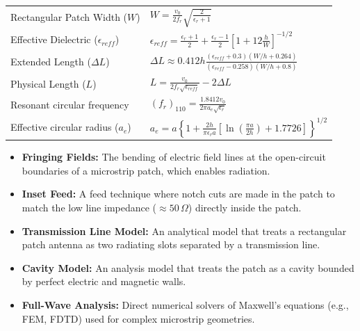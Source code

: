 \documentclass[12pt,a4paper]{article}
\renewcommand{\arraystretch}{1.45}
\begin{document}
\begin{tcolorbox}[formulabox, title={\textbf{Key Formulas and Metrics at a Glance}}]
\renewcommand{\arraystretch}{1.35}
\begin{tabularx}{\linewidth}{B{5.2cm} X}
Rectangular Patch Width ($W$) & $W = \frac{v_0}{2 f_r} \sqrt{\frac{2}{\epsilon_r + 1}}$ \\[4pt]
Effective Dielectric ($\epsilon_{reff}$) & $\epsilon_{reff} = \frac{\epsilon_r + 1}{2} + \frac{\epsilon_r - 1}{2} \left[ 1 + 12 \frac{h}{W} \right]^{-1/2}$ \\[4pt]
Extended Length ($\Delta L$) & $\Delta L \approx 0.412 h \frac{(\epsilon_{reff} + 0.3)(W/h + 0.264)}{(\epsilon_{reff} - 0.258)(W/h + 0.8)}$ \\[4pt]
Physical Length ($L$) & $L = \frac{v_0}{2 f_r \sqrt{\epsilon_{reff}}} - 2\Delta L$ \\[4pt]
Resonant circular frequency & $(f_r)_{110} = \frac{1.8412 v_0}{2\pi a_e \sqrt{\epsilon_r}}$ \\[4pt]
Effective circular radius ($a_e$) & $a_e = a \left\{ 1 + \frac{2h}{\pi \epsilon_r a} \left[ \ln\left(\frac{\pi a}{2h}\right) + 1.7726 \right] \right\}^{1/2}$ \\
\end{tabularx}
\end{tcolorbox}

\begin{tcolorbox}[defbox, title={\textbf{One-Line Definitions}}]
\begin{itemize}[leftmargin=*, itemsep=2pt, topsep=0pt]
  \item \textbf{Fringing Fields:} The bending of electric field lines at the open-circuit boundaries of a microstrip patch, which enables radiation.
  \item \textbf{Inset Feed:} A feed technique where notch cuts are made in the patch to match the low line impedance ($\approx 50\,\Omega$) directly inside the patch.
  \item \textbf{Transmission Line Model:} An analytical model that treats a rectangular patch antenna as two radiating slots separated by a transmission line.
  \item \textbf{Cavity Model:} An analysis model that treats the patch as a cavity bounded by perfect electric and magnetic walls.
  \item \textbf{Full-Wave Analysis:} Direct numerical solvers of Maxwell's equations (e.g., FEM, FDTD) used for complex microstrip geometries.
\end{itemize}
\end{tcolorbox}
\end{document}
